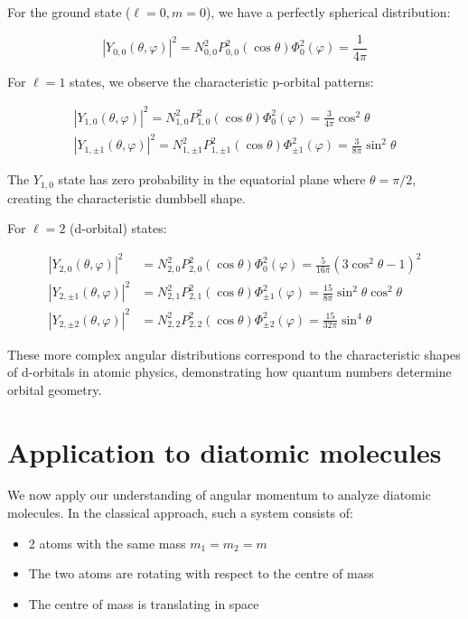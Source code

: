 For the ground state ($\ell=0, m=0$), we have a perfectly spherical distribution:

\begin{equation}
\left|Y_{0,0}(\theta, \varphi)\right|^{2}=N_{0,0}^{2} P_{0,0}^{2}(\cos \theta) \Phi_{0}^{2}(\varphi)=\frac{1}{4 \pi}
\end{equation}

For $\ell=1$ states, we observe the characteristic p-orbital patterns:

\[
\begin{array}{r}
\left|Y_{1,0}(\theta, \varphi)\right|^{2}=N_{1,0}^{2} P_{1,0}^{2}(\cos \theta) \Phi_{0}^{2}(\varphi)=\frac{3}{4 \pi} \cos ^{2} \theta \\
\left|Y_{1, \pm 1}(\theta, \varphi)\right|^{2}=N_{1, \pm 1}^{2} P_{1, \pm 1}^{2}(\cos \theta) \Phi_{ \pm 1}^{2}(\varphi)=\frac{3}{8 \pi} \sin ^{2} \theta
\end{array}
\]

The $Y_{1,0}$ state has zero probability in the equatorial plane where $\theta=\pi/2$, creating the characteristic dumbbell shape.

For $\ell=2$ (d-orbital) states:

\begin{align}
\left|Y_{2,0}(\theta, \varphi)\right|^{2} & =N_{2,0}^{2} P_{2,0}^{2}(\cos \theta) \Phi_{0}^{2}(\varphi)=\frac{5}{16 \pi}\left(3 \cos ^{2} \theta-1\right)^{2} \\
\left|Y_{2, \pm 1}(\theta, \varphi)\right|^{2} & =N_{2,1}^{2} P_{2,1}^{2}(\cos \theta) \Phi_{ \pm 1}^{2}(\varphi)=\frac{15}{8 \pi} \sin ^{2} \theta \cos ^{2} \theta  \\
\left|Y_{2, \pm 2}(\theta, \varphi)\right|^{2} & =N_{2,2}^{2} P_{2,2}^{2}(\cos \theta) \Phi_{ \pm 2}^{2}(\varphi)=\frac{15}{32 \pi} \sin ^{4} \theta
\end{align}

These more complex angular distributions correspond to the characteristic shapes of d-orbitals in atomic physics, demonstrating how quantum numbers determine orbital geometry.

\section{Application to diatomic molecules}
We now apply our understanding of angular momentum to analyze diatomic molecules. In the classical approach, such a system consists of:

\begin{itemize}
  \item 2 atoms with the same mass $m_{1}=m_{2}=m$
  \item The two atoms are rotating with respect to the centre of mass
  \item The centre of mass is translating in space
\end{itemize}

